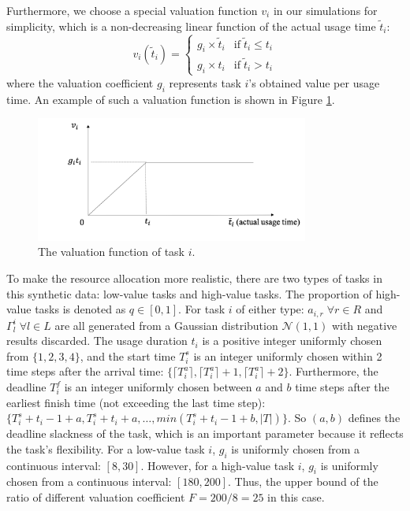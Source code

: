 \documentclass[11pt]{phdthesis}
\begin{document}
Furthermore, we choose a special valuation function $ v_i $ in our simulations for simplicity, which is a non-decreasing linear function of the actual usage time $ \tilde{t}_i $:
\[ v_i(\tilde{t}_i) =
\begin{cases}
g_i \times \tilde{t}_i & \text{if} \; \tilde{t}_i \leq t_i  \\
g_i \times t_i  &    \text{if} \; \tilde{t}_i > t_i
\end{cases} 
\]
where the valuation coefficient $g_i$ represents task $ i $'s obtained value per usage time. 
An example of such a valuation function is shown in Figure \ref{fig:function}. 
\begin{figure}
    \centering
    \includegraphics[width=0.8\textwidth]{./Figures/valuation_function.png}
    \caption{\label{fig:function} The valuation function of task $i$.}
\end{figure}

To make the resource allocation more realistic, there are two types of tasks in this synthetic data: low-value tasks and high-value tasks. The proportion of high-value tasks is denoted as $ q \in [0, 1] $. For task $ i $ of either type: $a_{i,r} \; \forall r \in R$ and $\Gamma_l^i \; \forall l \in L$ are all generated from a Gaussian distribution $\mathcal{N} (1, 1)$ with negative results discarded. The usage duration $t_i$ is a positive integer uniformly chosen from $\{ 1,2,3,4 \} $, and the start time $T_i^s$ is an integer uniformly chosen within 2 time steps after the arrival time: $\{ \lceil{T_i^a}\rceil, \lceil{T_i^a}\rceil + 1, \lceil T_i^a \rceil +2 \} $. Furthermore, the deadline $T_i^f$ is an integer uniformly chosen between $ a $ and $ b $ time steps after the earliest finish time (not exceeding the last time step): $\{ T_i^s+t_i-1+a,T_i^s+t_i+a,\ldots, min(T_i^s+t_i-1+b, |T|) \} $. So $ (a, b)$ defines the deadline slackness of the task, which is an important parameter because it reflects the task's flexibility. For a low-value task $ i $, $g_i$ is uniformly chosen from a continuous interval: $[8,30]$. However, for a high-value task $ i $,  $g_i$ is uniformly chosen from a continuous interval: $[180,200]$. Thus, the upper bound of the ratio of different valuation coefficient $ F = 200/8 = 25 $ in this case. 
\end{document}
